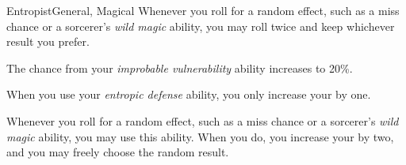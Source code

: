 \begin{feat}{Entropist}{General, Magical}
         Whenever you roll for a random effect, such as a miss chance or a sorcerer's \textit{wild magic} ability, you may roll twice and keep whichever result you prefer.

         The chance from your \textit{improbable vulnerability} ability increases to 20\%.

         When you use your \textit{entropic defense} ability, you only increase your  by one.

         Whenever you roll for a random effect, such as a miss chance or a sorcerer's \textit{wild magic} ability, you may use this ability.
        When you do, you increase your  by two, and you may freely choose the random result.
    \end{feat}


